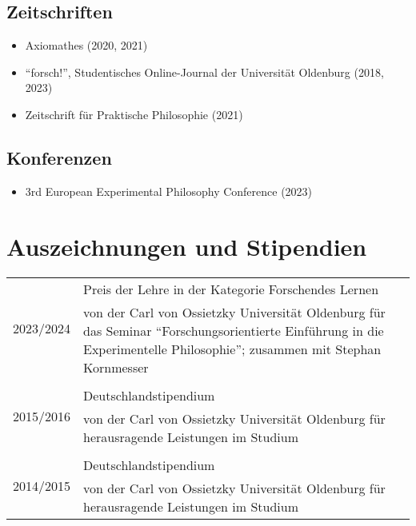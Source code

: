 \documentclass[a4paper,10pt]{article}
\begin{document}
\subsection*{Zeitschriften}
\begin{itemize}
   \item Axiomathes (2020, 2021)
   \item \enquote{forsch!}, Studentisches Online-Journal der Universität Oldenburg (2018, 2023)
   \item Zeitschrift für Praktische Philosophie (2021)
\end{itemize}

\subsection*{Konferenzen}
\begin{itemize}
   \item 3rd European Experimental Philosophy Conference (2023)
\end{itemize}


\clearpage
\section{Auszeichnungen und Stipendien}
\begin{longtable}{p{2cm}p{}}
\multirow{2}{2cm}{\footnotesize{2023/2024}} & Preis der Lehre in der Kategorie Forschendes Lernen\\
& \footnotesize{von der Carl von Ossietzky Universität Oldenburg für das Seminar \enquote{Forschungsorientierte Einführung in die Experimentelle Philosophie}; zusammen mit Stephan Kornmesser}\\
\\
\multirow{2}{2cm}{\footnotesize{2015/2016}} & Deutschlandstipendium\\
& \footnotesize{von der Carl von Ossietzky Universität Oldenburg für herausragende Leistungen im Studium}\\
\\
\multirow{2}{2cm}{\footnotesize{2014/2015}} & Deutschlandstipendium\\
& \footnotesize{von der Carl von Ossietzky Universität Oldenburg für herausragende Leistungen im Studium}\\
\end{longtable}


\clearpage
\end{document}
